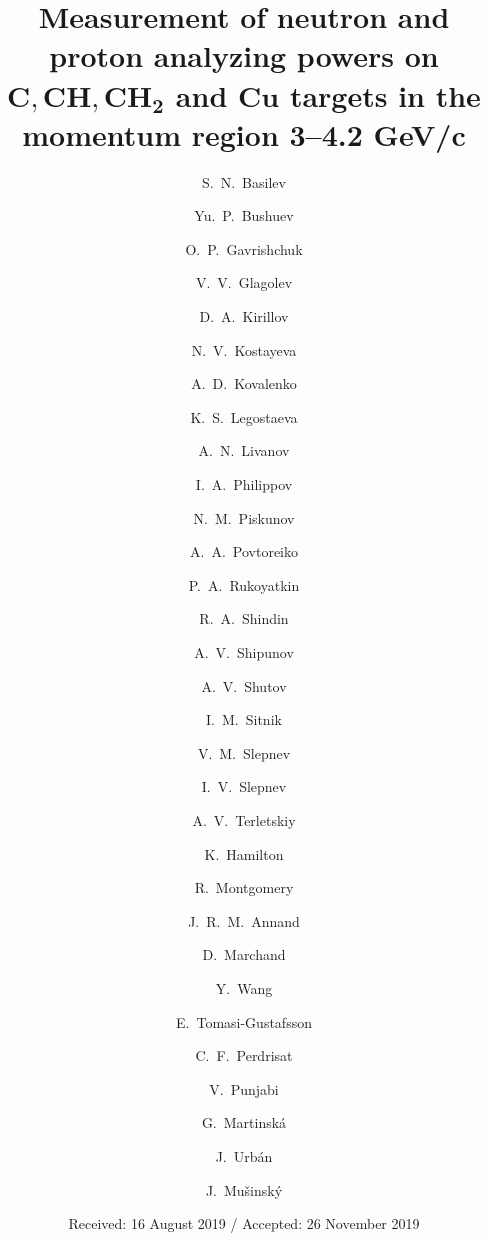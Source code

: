 \documentclass[twocolumn,epjc3]{svjour3}
\begin{document}
\title{Measurement of neutron and proton analyzing powers on $\boldsymbol{C, CH, CH_2}$ and $\boldsymbol{Cu}$ targets in the momentum region 3--4.2 GeV/c}

\author{\raggedright
  S.~N.~Basilev     \and Yu.~P.~Bushuev         \and
  O.~P.~Gavrishchuk \and V.~V.~Glagolev         \and
  D.~A.~Kirillov    \and N.~V.~Kostayeva        \and
  A.~D.~Kovalenko   \and K.~S.~Legostaeva       \and
  A.~N.~Livanov     \and I.~A.~Philippov        \and
  N.~M.~Piskunov    \and A.~A.~Povtoreiko       \and
  P.~A.~Rukoyatkin  \and R.~A.~Shindin          \and
  A.~V.~Shipunov    \and A.~V.~Shutov           \and
  I.~M.~Sitnik      \and V.~M.~Slepnev          \and
  I.~V.~Slepnev     \and A.~V.~Terletskiy       \and
  K.~Hamilton       \and R.~Montgomery          \and
  J.~R.~M.~Annand   \and D.~Marchand            \and
  Y.~Wang           \and E.~Tomasi-Gustafsson \and
  C.~F.~Perdrisat   \and V.~Punjabi             \and
  G.~Martinsk\'{a}  \and J.~Urb\'{a}n           \and
  J.~Mu\v{s}insk\'{y}
}

\date{Received: 16 August 2019 / Accepted: 26 November 2019}
\maketitle
\end{document}

